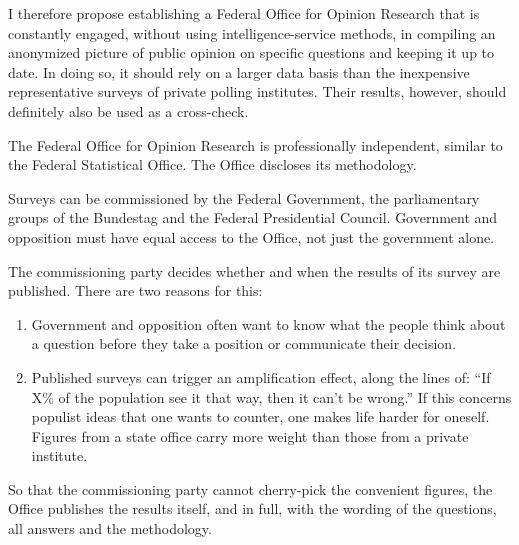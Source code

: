 I therefore propose establishing a Federal Office for Opinion Research that is constantly engaged, without using intelligence-service methods,
in compiling an anonymized picture of public opinion on specific questions and keeping it up to date.
In doing so, it should rely on a larger data basis than the inexpensive representative surveys of private polling institutes.
Their results, however, should definitely also be used as a cross-check.

The Federal Office for Opinion Research is professionally independent, similar to the Federal Statistical Office.
The Office discloses its methodology.

Surveys can be commissioned by the Federal Government, the parliamentary groups of the Bundestag and the Federal Presidential Council.
Government and opposition must have equal access to the Office, not just the government alone.

The commissioning party decides whether and when the results of its survey are published.
There are two reasons for this:
\begin{enumerate}[label=\alph*)]
    \item Government and opposition often want to know what the people think about a question before they take a position or communicate their decision.
    \item Published surveys can trigger an amplification effect, along the lines of: \enquote{If X\% of the population see it that way, then it can't be wrong.}
    If this concerns populist ideas that one wants to counter, one makes life harder for oneself.
    Figures from a state office carry more weight than those from a private institute.
\end{enumerate}

So that the commissioning party cannot cherry-pick the convenient figures, the Office publishes the results itself, and in full, with the wording of the questions, all answers and the methodology.
